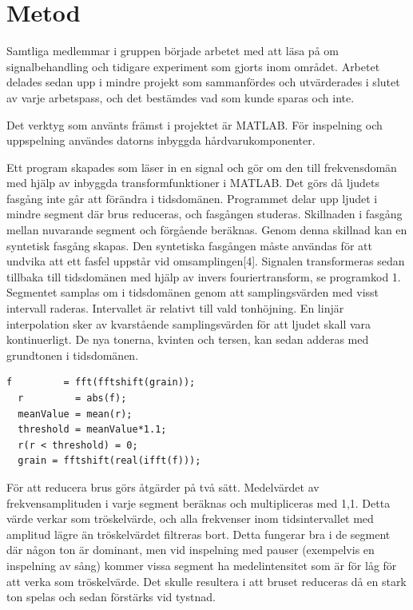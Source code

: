 \documentclass[12pt,a4paper]{article}
\begin{document}
\section{Metod}
Samtliga medlemmar i gruppen började arbetet med att läsa på om signalbehandling och tidigare experiment som gjorts inom området. Arbetet delades sedan upp i mindre projekt som sammanfördes och utvärderades i slutet av varje arbetspass, och det bestämdes vad som kunde sparas och inte.

Det verktyg som använts främst i projektet är MATLAB. För inspelning och uppspelning användes datorns inbyggda hårdvarukomponenter.

Ett program skapades som läser in en signal och gör om den till frekvensdomän med hjälp av inbyggda transformfunktioner i MATLAB. Det görs då ljudets fasgång inte går att förändra i tidsdomänen. Programmet delar upp ljudet i mindre segment där brus reduceras, och fasgången studeras. Skillnaden i fasgång mellan nuvarande segment och förgående beräknas. Genom denna skillnad kan en syntetisk fasgång skapas. Den syntetiska fasgången måste användas för att undvika att ett fasfel uppstår vid omsamplingen[4]. Signalen transformeras sedan tillbaka till tidsdomänen med hjälp av invers fouriertransform, se programkod 1. Segmentet samplas om i tidsdomänen genom att samplingsvärden med visst intervall raderas. Intervallet är relativt till vald tonhöjning. En linjär interpolation sker av kvarstående samplingsvärden för att ljudet skall vara kontinuerligt. De nya tonerna, kvinten och tersen, kan sedan adderas med grundtonen i tidsdomänen.

\begin{lstlisting}[caption={fouriertransform (fft) samt invers fouriertransform (ifft)},label={lst:myListing}]
  f         = fft(fftshift(grain));
  r         = abs(f);
  meanValue = mean(r);
  threshold = meanValue*1.1;
  r(r < threshold) = 0;
  grain = fftshift(real(ifft(f)));
\end{lstlisting}

För att reducera brus görs åtgärder på två sätt. Medelvärdet av frekvensamplituden i varje segment beräknas och multipliceras med 1,1. Detta värde verkar som tröskelvärde, och alla frekvenser inom tidsintervallet med amplitud lägre än tröskelvärdet filtreras bort. Detta fungerar bra i de segment där någon ton är dominant, men vid inspelning med pauser (exempelvis en inspelning av sång) kommer vissa segment ha medelintensitet som är för låg för att verka som tröskelvärde. Det skulle resultera i att bruset reduceras då en stark ton spelas och sedan förstärks vid tystnad.
\end{document}
